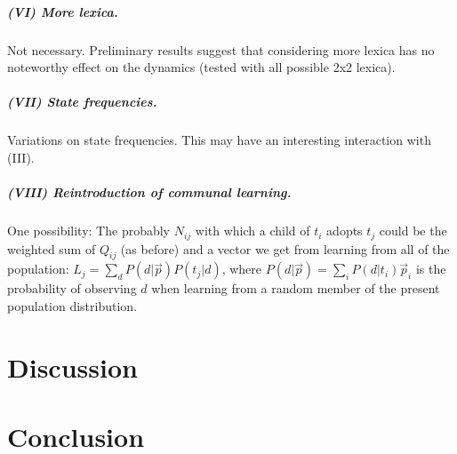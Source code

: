 \documentclass[11pt]{article}
\begin{document}
\subparagraph{(VI) More lexica.} Not necessary. Preliminary results suggest that considering more lexica has no noteworthy effect on the dynamics (tested with all possible 2x2 lexica).

\subparagraph{(VII) State frequencies.} Variations on state frequencies. This may have an interesting interaction with (III).

\subparagraph{(VIII) Reintroduction of communal learning.} One possibility: The probably $N_{ij}$ with which a child of $t_i$ adopts $t_j$ could be the weighted sum of $Q_{ij}$ (as before) and a vector we get from learning from all of the population: $L_j = \sum_d P(d | \vec{p})  P(t_j | d)$, where $P(d | \vec{p}) = \sum_{i} P(d | t_i)  \vec{p}_i$ is the probability of observing $d$ when learning from a random member of the present population distribution.


\section{Discussion}
\section{Conclusion}




\end{document}
